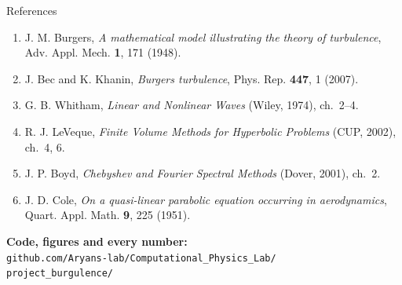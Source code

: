 \documentclass[aspectratio=169,10pt]{beamer}
\newcommand{\hl}[1]{\textcolor{accent2}{\textbf{#1}}}
\begin{document}
\begin{frame}{References}
  \small
  \begin{enumerate}
    \item J. M. Burgers, \emph{A mathematical model illustrating the theory of
          turbulence}, Adv. Appl. Mech. \textbf{1}, 171 (1948).
    \item J. Bec and K. Khanin, \emph{Burgers turbulence},
          Phys. Rep. \textbf{447}, 1 (2007).
    \item G. B. Whitham, \emph{Linear and Nonlinear Waves} (Wiley, 1974),
          ch.~2--4.
    \item R. J. LeVeque, \emph{Finite Volume Methods for Hyperbolic Problems}
          (CUP, 2002), ch.~4, 6.
    \item J. P. Boyd, \emph{Chebyshev and Fourier Spectral Methods}
          (Dover, 2001), ch.~2.
    \item J. D. Cole, \emph{On a quasi-linear parabolic equation occurring in
          aerodynamics}, Quart. Appl. Math. \textbf{9}, 225 (1951).
  \end{enumerate}
  \vspace{6mm}
  \centering
  \hl{Code, figures and every number:}\\[1mm]
  \texttt{github.com/Aryans-lab/Computational\_Physics\_Lab/}\\
  \texttt{project\_burgulence/}
\end{frame}
\end{document}
